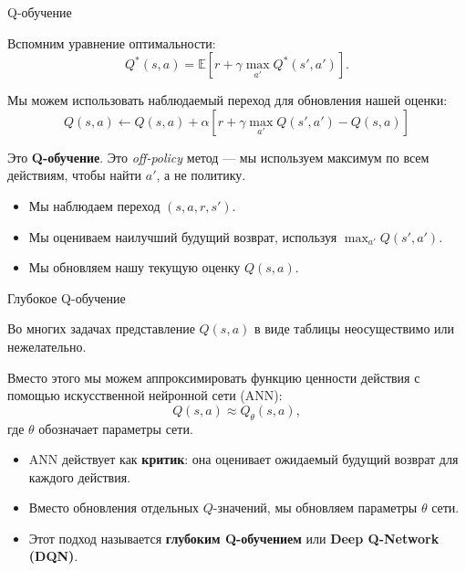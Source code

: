 \documentclass{beamer}
\begin{document}
	
	\begin{frame}{Q-обучение}
		\begin{flushleft}
			
			Вспомним уравнение оптимальности:
			\[
			Q^*(s,a)=
			\mathbb{E}\left[
			r+\gamma\max_{a'}Q^*(s',a')
			\right].
			\]
			
			\vspace{0.2cm}
			
			Мы можем использовать наблюдаемый переход для обновления нашей оценки:
			\[
			\boxed{
				Q(s,a)\leftarrow Q(s,a)+\alpha
				\left[
				r+\gamma\max_{a'}Q(s',a')
				-Q(s,a)
				\right]
			}
			\]
			
			\vspace{0.3cm}
			
			Это \textbf{Q-обучение}. Это \emph{off-policy} метод — мы используем максимум по всем действиям, чтобы найти $a'$, а не политику.
			
			\vspace{0.2cm}
			
			\begin{itemize}
				\item Мы наблюдаем переход $(s,a,r,s')$.
				\item Мы оцениваем наилучший будущий возврат, используя
				$\max_{a'}Q(s',a')$.
				\item Мы обновляем нашу текущую оценку $Q(s,a)$.
			\end{itemize}
			
		\end{flushleft}
	\end{frame}
	
	
	\begin{frame}{Глубокое Q-обучение}
		\begin{flushleft}
			
			Во многих задачах представление $Q(s,a)$ в виде таблицы
			неосуществимо или нежелательно.
			
			\vspace{0.3cm}
			
			Вместо этого мы можем аппроксимировать функцию ценности действия
			с помощью искусственной нейронной сети (ANN):
			\[
			Q(s,a) \approx Q_\theta(s,a),
			\]
			где $\theta$ обозначает параметры сети.
			
			\vspace{0.3cm}
			
			\begin{itemize}
				\item ANN действует как \textbf{критик}: она оценивает
				ожидаемый будущий возврат для каждого действия.
				\item Вместо обновления отдельных $Q$-значений,
				мы обновляем параметры $\theta$ сети.
				\item Этот подход называется
				\textbf{глубоким Q-обучением} или
				\textbf{Deep Q-Network (DQN)}.
			\end{itemize}
			
		\end{flushleft}
	\end{frame}
	
\end{document}
